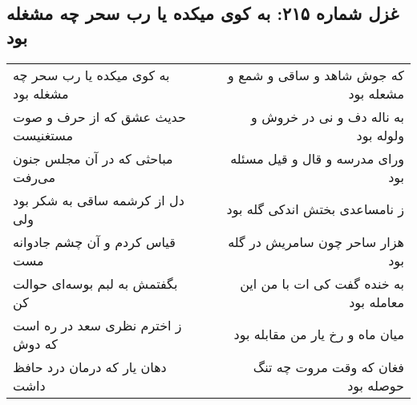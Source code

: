 \begin{center}
\section*{غزل شماره ۲۱۵: به کوی میکده یا رب سحر چه مشغله بود}
\label{sec:sh215}
\begin{longtable}{l p{0.5cm} r}
به کوی میکده یا رب سحر چه مشغله بود
&&
که جوش شاهد و ساقی و شمع و مشعله بود
\\
حدیث عشق که از حرف و صوت مستغنیست
&&
به ناله دف و نی در خروش و ولوله بود
\\
مباحثی که در آن مجلس جنون می‌رفت
&&
ورای مدرسه و قال و قیل مسئله بود
\\
دل از کرشمه ساقی به شکر بود ولی
&&
ز نامساعدی بختش اندکی گله بود
\\
قیاس کردم و آن چشم جادوانه مست
&&
هزار ساحر چون سامریش در گله بود
\\
بگفتمش به لبم بوسه‌ای حوالت کن
&&
به خنده گفت کی ات با من این معامله بود
\\
ز اخترم نظری سعد در ره است که دوش
&&
میان ماه و رخ یار من مقابله بود
\\
دهان یار که درمان درد حافظ داشت
&&
فغان که وقت مروت چه تنگ حوصله بود
\\
\end{longtable}
\end{center}
